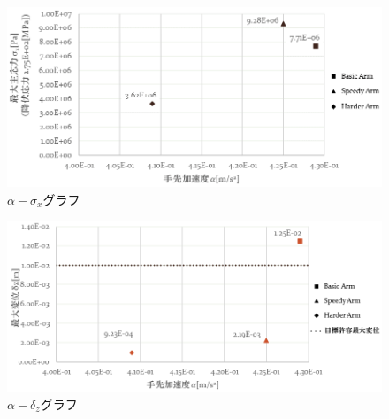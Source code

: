 \documentclass[10pt,b5paper,papersize,dvipdfmx]{jsbook}
\begin{document}
\begin{figure}[H]
  \centering
  \includegraphics[width=.9\textwidth]{img/robot31.png}
  \caption{$\alpha-\sigma_x$グラフ}
  \label{fig:alpha-sigma_xグラフ}
\end{figure}
\begin{figure}[H]
  \centering
  \includegraphics[width=.9\textwidth]{img/robot32.png}
  \caption{$\alpha-\delta_z$グラフ}
  \label{fig:alpha-delta_zグラフ}
\end{figure}
\end{document}
